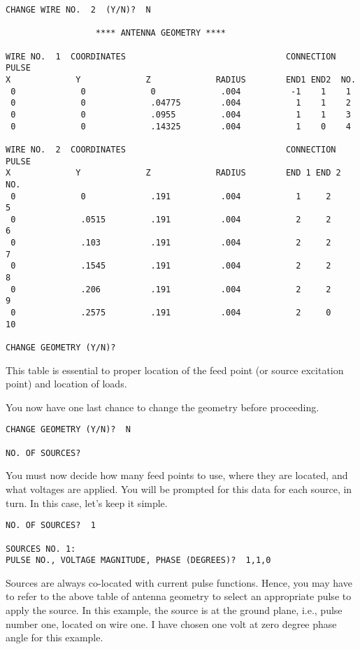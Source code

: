 \documentclass[12pt]{article}
\begin{document}
\begin{Verbatim}
CHANGE WIRE NO.  2  (Y/N)?  N

                  **** ANTENNA GEOMETRY ****

WIRE NO.  1  COORDINATES                                CONNECTION PULSE
X             Y             Z             RADIUS        END1 END2  NO.
 0             0             0             .004          -1    1    1
 0             0             .04775        .004           1    1    2
 0             0             .0955         .004           1    1    3
 0             0             .14325        .004           1    0    4

WIRE NO.  2  COORDINATES                                CONNECTION   PULSE
X             Y             Z             RADIUS        END 1 END 2  NO.
 0             0             .191          .004           1     2      5
 0             .0515         .191          .004           2     2      6
 0             .103          .191          .004           2     2      7
 0             .1545         .191          .004           2     2      8
 0             .206          .191          .004           2     2      9
 0             .2575         .191          .004           2     0     10

CHANGE GEOMETRY (Y/N)?
\end{Verbatim}

This table is essential to proper location of the feed point (or source
excitation point) and location of loads.

You now have one last chance to change the geometry before proceeding.

\begin{Verbatim}
CHANGE GEOMETRY (Y/N)?  N

NO. OF SOURCES?
\end{Verbatim}

You must now decide how many feed points to use, where they are located,
and what voltages are applied. You will be prompted for this data for
each source, in turn. In this case, let's keep it simple.

\begin{Verbatim}
NO. OF SOURCES?  1

SOURCES NO. 1:
PULSE NO., VOLTAGE MAGNITUDE, PHASE (DEGREES)?  1,1,0
\end{Verbatim}

Sources are always co-located with current pulse functions. Hence, you
may have to refer to the above table of antenna geometry to select an
appropriate pulse to apply the source. In this example, the source is at
the ground plane, i.e., pulse number one, located on wire one. I have
chosen one volt at zero degree phase angle for this example.
\end{document}
